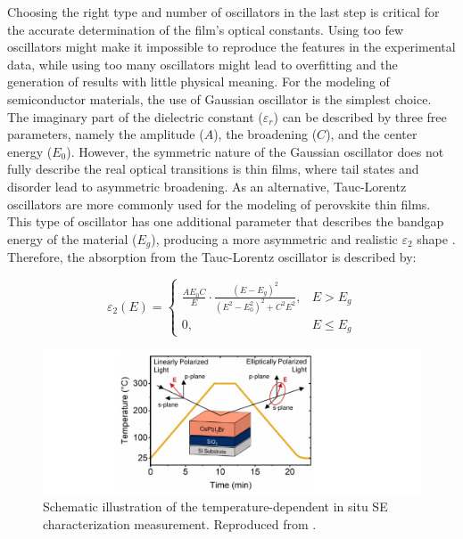 Choosing the right type and number of oscillators in the last step is critical for the accurate determination of the film's optical constants. Using too few oscillators might make it impossible to reproduce the features in the experimental data, while using too many oscillators might lead to overfitting and the generation of results with little physical meaning. For the modeling of semiconductor materials, the use of Gaussian oscillator is the simplest choice. The imaginary part of the dielectric constant ($\varepsilon_r$) can be described by three free parameters, namely the amplitude ($A$), the broadening ($C$), and the center energy ($E_0$). However, the symmetric nature of the Gaussian oscillator does not fully describe the real optical transitions is thin films, where tail states and disorder lead to asymmetric broadening. As an alternative, Tauc-Lorentz oscillators are more commonly used for the modeling of perovskite thin films. This type of oscillator has one additional parameter that describes the bandgap energy of the material ($E_g$), producing a more asymmetric and realistic $\varepsilon_2$ shape \cite{Jellison1996ParameterizationRegion}. Therefore, the absorption from the Tauc-Lorentz oscillator is described by: 

\begin{equation}
\varepsilon_2(E) =
\begin{cases}
\frac{A E_0 C}{E} \cdot \frac{(E - E_g)^2}{(E^2 - E_0^2)^2 + C^2 E^2}, & E > E_g \\
0, & E \leq E_g
\end{cases}
\label{eq:tauc_lorentz}
\end{equation}

\begin{figure}[tbp]
  \centering
  \medskip
  \includegraphics[width=.99\textwidth]{chapters/ellipsometry/image/experiment_description.pdf}
  \caption[Schematic illustration of the temperature-dependent in situ SE characterization measurement.]{Schematic illustration of the temperature-dependent in situ SE characterization measurement. Reproduced from \cite{Papadopoulou2024InEllipsometry}.}
  \label{fig:ellipsometry:experiment_description}
\end{figure}


